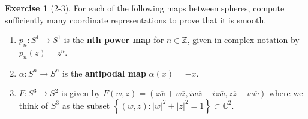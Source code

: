 \documentclass[reqno]{amsart}
\theoremstyle{plain}%
\theoremstyle{definition}
\newtheorem{exercise}[theorem]{Exercise}
\theoremstyle{remark}
\begin{document}
    \begin{exercise}[2-3]
        For each of the following maps between spheres, compute sufficiently
        many coordinate representations to prove that it is smooth.
        \begin{enumerate}
            \item $p_n  \colon S^{1} \to S^{1}$ is the \textbf{nth power map}
                for $n \in \mathbb{Z}$, given in complex notation by
                $p_n (z) = z^{n}$.
            \item $\alpha  \colon S^{n} \to S^{n}$ is the \textbf{antipodal map}
                $\alpha(x) = -x$.
            \item $F  \colon S^{3}\to S^2 $ is given by
                $F(w,z) = \left( z \overline{w} + w \overline{z},
                i w \overline{z} - i z \overline{w},
            z \overline{z} - w \overline{w} \right) $ where we think of
            $S^3$ as the subset 
            $\left\{ \left( w,z \right)  \colon
            \left| w \right|^2 + \left| z \right|^2 = 1\right\} \subset
            \mathbb{C}^2$.
        \end{enumerate}
    \end{exercise}
\end{document}
